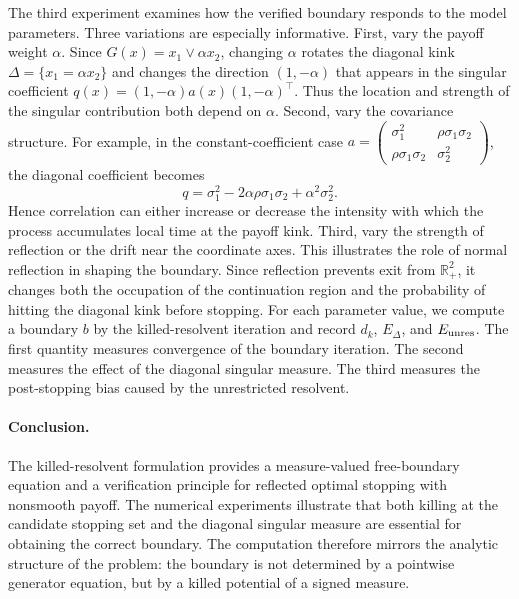 \documentclass[pdflatex,sn-mathphys-num]{sn-jnl}
\theoremstyle{plain}
\theoremstyle{definition}
\theoremstyle{remark}
\numberwithin{equation}{section}
\begin{document}
The third experiment examines how the verified boundary responds to the model parameters. Three variations are especially informative. First, vary the payoff weight \(\alpha\). Since 
$G(x)=x_1\vee\alpha x_2$, 
changing \(\alpha\) rotates the diagonal kink 
$\Delta=\{x_1=\alpha x_2\}$ 
and changes the direction 
$(1,-\alpha) $
that appears in the singular coefficient 
$q(x)=(1,-\alpha)a(x)(1,-\alpha)^\top $. 
Thus the location and strength of the singular contribution both depend on \(\alpha\). Second, vary the covariance structure. For example, in the constant-coefficient case 
$\displaystyle a= 
\begin{pmatrix} 
\sigma_1^2 & \rho\sigma_1\sigma_2\\ 
\rho\sigma_1\sigma_2 & \sigma_2^2 
\end{pmatrix}$, 
the diagonal coefficient becomes 
\begin{equation} \label{eq:q-constant-covariance} 
q = \sigma_1^2 -2\alpha\rho\sigma_1\sigma_2 + \alpha^2\sigma_2^2 . 
\end{equation} 
Hence correlation can either increase or decrease the intensity with which the process accumulates local time at the payoff kink. Third, vary the strength of reflection or the drift near the coordinate axes. This illustrates the role of normal reflection in shaping the boundary. Since reflection prevents exit from \(\mathbb R_+^2\), it changes both the occupation of the continuation region and the probability of hitting the diagonal kink before stopping. For each parameter value, we compute a boundary \(b\) by the killed-resolvent iteration and record $d_k$, $E_\Delta$, and $E_{\rm unres}$. 
The first quantity measures convergence of the boundary iteration. The second measures the effect of the diagonal singular measure. The third measures the post-stopping bias caused by the unrestricted resolvent. 

\paragraph{Conclusion.} 
The killed-resolvent formulation provides a measure-valued free-boundary equation and a verification principle for reflected optimal stopping with nonsmooth payoff. The numerical experiments illustrate that both killing at the candidate stopping set and the diagonal singular measure are essential for obtaining the correct boundary. The computation therefore mirrors the analytic structure of the problem: the boundary is not determined by a pointwise generator equation, but by a killed potential of a signed measure.
\end{document}
